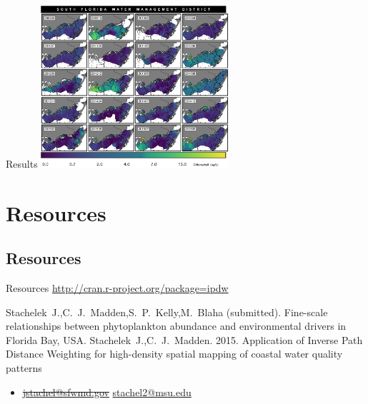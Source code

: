 \documentclass[compress,noflama,nosectionpages]{beamer}
\begin{document}
		\begin{frame}{Results}
			\includegraphics[height=6cm,keepaspectratio=true]{figures/multipanel.png}\\
		\end{frame}

\section{Resources}
\subsection{Resources}
\begin{frame}{Resources}
  \centering
  \url{http://cran.r-project.org/package=ipdw}
  \begin{thebibliography}{10}
  \beamertemplatearticlebibitems
	Stachelek~J.,C.~J.~Madden,S.~P.~Kelly,M.~Blaha (submitted). Fine-scale relationships between phytoplankton abundance and environmental drivers in Florida Bay, USA.
	\newblock {}
	Stachelek~J.,C.~J.~Madden. 2015. Application of Inverse Path Distance Weighting for high-density spatial mapping of coastal water quality patterns
	\newblock {}
  \end{thebibliography}

	\begin{itemize}
		\item \sout{\url{jstachel@sfwmd.gov}} \url{stachel2@msu.edu}
	\end{itemize}
\end{frame}
\end{document}
